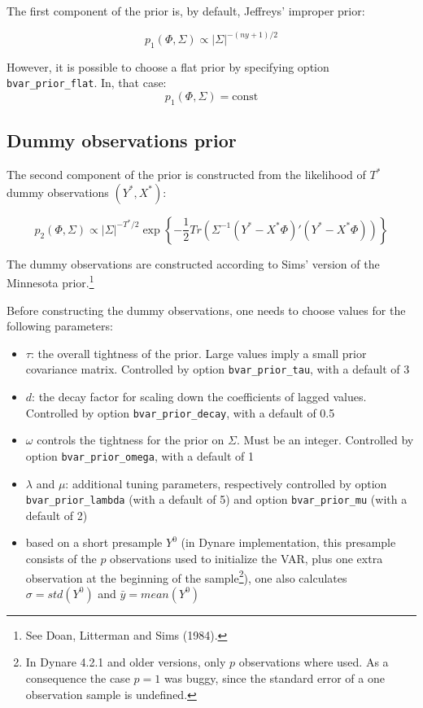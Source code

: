 \documentclass[11pt,a4paper]{article}
\begin{document}
The first component of the prior is, by default, Jeffreys' improper prior:

$$p_1(\Phi,\Sigma) \propto |\Sigma|^{-(ny+1)/2}$$

However, it is possible to choose a flat prior by specifying option \texttt{bvar\_prior\_flat}. In, that case:
$$p_1(\Phi, \Sigma) = \text{const}$$

\subsection{Dummy observations prior}

The second component of the prior is constructed from the likelihood of $T^*$ dummy observations $(Y^*,X^*)$:

$$p_2(\Phi, \Sigma) \propto |\Sigma|^{-T^*/2} \exp\left\{-\frac{1}{2}Tr(\Sigma^{-1}(Y^*-X^*\Phi)'(Y^*-X^*\Phi))\right\}$$

The dummy observations are constructed according to Sims' version of the Minnesota prior.\footnote{See Doan, Litterman and Sims (1984).}

Before constructing the dummy observations, one needs to choose values for the following parameters:
\begin{itemize}
\item $\tau$: the overall tightness of the prior. Large values imply a small prior covariance matrix. Controlled by option \texttt{bvar\_prior\_tau}, with a default of 3
\item $d$: the decay factor for scaling down the coefficients of lagged values. Controlled by option \texttt{bvar\_prior\_decay}, with a default of 0.5
\item $\omega$ controls the tightness for the prior on $\Sigma$. Must be an integer. Controlled by option \texttt{bvar\_prior\_omega}, with a default of 1
\item $\lambda$ and $\mu$: additional tuning parameters, respectively controlled by option \texttt{bvar\_prior\_lambda} (with a default of 5) and option \texttt{bvar\_prior\_mu} (with a default of 2)
\item based on a short presample $Y^0$ (in Dynare implementation, this
  presample consists of the $p$ observations used to initialize the VAR, plus
  one extra observation at the beginning of the sample\footnote{In Dynare 4.2.1
    and older versions, only $p$ observations where used. As a consequence the
    case $p=1$ was buggy, since the standard error of a one observation sample
    is undefined.}), one also calculates $\sigma = std(Y^0)$ and $\bar{y} =
  mean(Y^0)$
\end{itemize}
\end{document}
